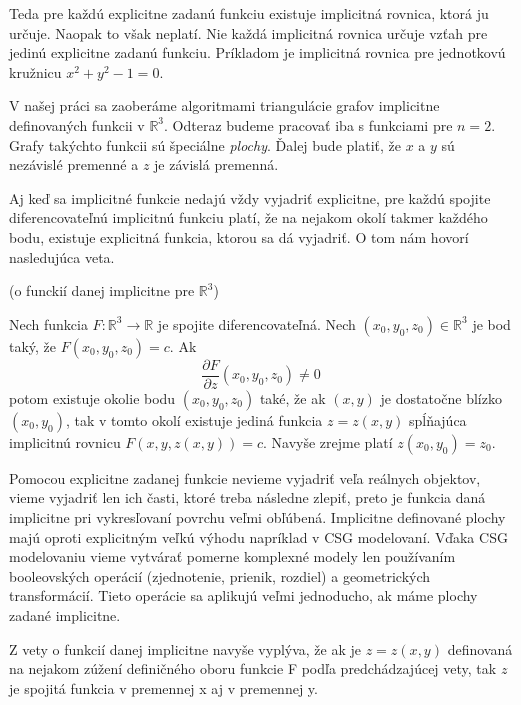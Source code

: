 Teda pre každú explicitne zadanú funkciu existuje implicitná rovnica, ktorá ju určuje.
Naopak to však neplatí. Nie každá implicitná rovnica určuje vzťah pre jedinú explicitne zadanú
funkciu. Príkladom je implicitná rovnica pre jednotkovú kružnicu $x^2 + y^2 - 1 = 0$. 


V našej práci sa zaoberáme algoritmami triangulácie grafov implicitne definovaných funkcii v 
$\mathbb{R}^3$. Odteraz
budeme pracovať iba s funkciami pre $n = 2$. Grafy takýchto funkcii sú špeciálne \textit{plochy}. 
Ďalej bude platiť, že $x$ a $y$ sú nezávislé premenné a $z$ je závislá premenná.


Aj keď sa implicitné funkcie nedajú vždy vyjadriť explicitne, pre každú spojite diferencovateľnú
implicitnú funkciu platí, že na nejakom okolí takmer každého bodu, existuje explicitná funkcia,
ktorou sa dá vyjadriť.
O tom nám hovorí nasledujúca veta.





\begin{theorem}
 (o funckií danej implicitne pre $\mathbb{R}^3$)
 
 Nech funkcia $F: \mathbb{R}^3 \to \mathbb{R}$ je spojite diferencovateľná. 
 Nech $(x_0, y_0, z_0) \in \mathbb{R}^3$ je bod taký, že $F(x_0, y_0, z_0) = c$.
 Ak $$\frac{\partial F}{\partial z} (x_0, y_0, z_0) \neq 0$$ potom existuje okolie 
 bodu $(x_0, y_0, z_0)$ také, že ak $(x, y)$ je dostatočne blízko $(x_0, y_0)$, 
 tak v tomto okolí existuje jediná funkcia $z = z(x ,y)$ spĺňajúca implicitnú rovnicu
 $F(x, y, z(x, y)) = c$. Navyše zrejme platí $z(x_0, y_0) = z_0$.
\end{theorem}

Pomocou explicitne zadanej funkcie nevieme vyjadriť veľa reálnych objektov, 
vieme vyjadriť len ich časti, ktoré treba následne zlepiť, 
preto je funkcia daná implicitne pri vykresľovaní povrchu veľmi obľúbená. 
Implicitne definované plochy majú oproti explicitným veľkú výhodu napríklad
v CSG modelovaní. Vďaka CSG modelovaniu vieme vytvárať pomerne komplexné
modely len používaním booleovských operácií (zjednotenie, prienik, rozdiel)
a geometrických transformácií. Tieto operácie sa aplikujú veľmi jednoducho, ak
máme plochy zadané implicitne.


\begin{note}
    Z vety o funkcií danej implicitne navyše vyplýva, že ak je $z = z(x,y)$ definovaná na nejakom 
    zúžení definičného oboru funkcie F podľa predchádzajúcej vety, tak $z$ je spojitá funkcia v 
    premennej x aj v premennej y. 
\end{note}

